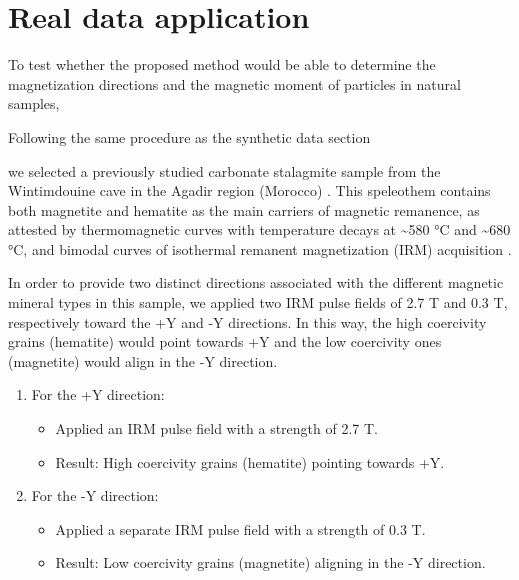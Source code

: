 \section{Real data application}

To test whether the proposed method would be able to determine the
magnetization directions and the magnetic moment of particles in natural
samples, 

Following the same procedure as the synthetic data section 

we selected a previously studied carbonate stalagmite sample from the Wintimdouine cave in the Agadir region (Morocco) \citep{Ait2019Hydro}. This speleothem contains both magnetite and hematite as the main carriers of
magnetic remanence, as attested by thermomagnetic curves with temperature
decays at {\textasciitilde}580 °C and {\textasciitilde}680 °C, and bimodal
curves of isothermal remanent magnetization (IRM) acquisition \citep{carmo2019speleothem}.

In order to provide two distinct directions associated with the different
magnetic mineral types in this sample, we applied two IRM pulse fields of 2.7 T and 0.3 T, respectively toward the +Y and -Y directions. In this way, the high coercivity grains (hematite) would point towards +Y and the low coercivity ones (magnetite) would align in the -Y direction.

\begin{enumerate}
  \item For the +Y direction:
    \begin{itemize}
      \item Applied an IRM pulse field with a strength of 2.7 T.
      \item Result: High coercivity grains (hematite) pointing towards +Y.
    \end{itemize}
  
  \item For the -Y direction:
    \begin{itemize}
      \item Applied a separate IRM pulse field with a strength of 0.3 T.
      \item Result: Low coercivity grains (magnetite) aligning in the -Y direction.
    \end{itemize}
\end{enumerate}


